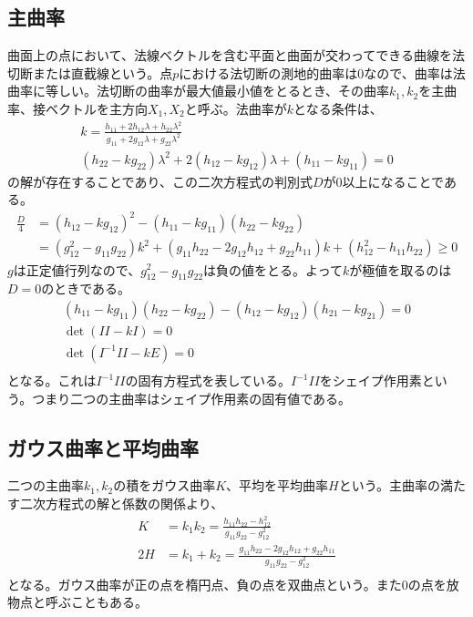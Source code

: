     \subsection{主曲率}
        曲面上の点において、法線ベクトルを含む平面と曲面が交わってできる曲線を法切断または直截線という。点$p$における法切断の測地的曲率は0なので、曲率は法曲率に等しい。法切断の曲率が最大値最小値をとるとき、その曲率$k_1,k_2$を主曲率、接ベクトルを主方向$X_1,X_2$と呼ぶ。法曲率が$k$となる条件は、
        \begin{gather*}
            k = \frac{h_{11} + 2h_{12}\lambda + h_{22}\lambda^2}{g_{11} + 2g_{12}\lambda + g_{22}\lambda^2}\\
            (h_{22}-kg_{22})\lambda^2 + 2(h_{12}-kg_{12})\lambda + (h_{11}-kg_{11}) = 0
        \end{gather*}
        の解が存在することであり、この二次方程式の判別式$D$が0以上になることである。
        \begin{align*}
            \frac{D}{4} &= (h_{12}-kg_{12})^2 - (h_{11}-kg_{11})(h_{22}-kg_{22})\\
            &= (g_{12}^2-g_{11}g_{22})k^2
            + (g_{11}h_{22}-2g_{12}h_{12}+g_{22}h_{11})k
            + (h_{12}^2-h_{11}h_{22}) \geq 0
        \end{align*}
        $g$は正定値行列なので、$g_{12}^2-g_{11}g_{22}$は負の値をとる。よって$k$が極値を取るのは$D = 0$のときである。
        \begin{align*}
            (h_{11}-kg_{11})(h_{22}-kg_{22})
            -(h_{12}-kg_{12})(h_{21}-kg_{21}) = 0\\
            \det(II - kI) = 0\\
            \det(I^{-1}II - kE) = 0\\
        \end{align*}
        となる。これは$I^{-1}II$の固有方程式を表している。$I^{-1}II$をシェイプ作用素という。つまり二つの主曲率はシェイプ作用素の固有値である。

    \subsection{ガウス曲率と平均曲率}
        二つの主曲率$k_1,k_2$の積をガウス曲率$K$、平均を平均曲率$H$という。主曲率の満たす二次方程式の解と係数の関係より、
        \begin{align*}
            K &= k_1k_2 = \frac{h_{11}h_{22} - h_{12}^2}{g_{11}g_{22} - g_{12}^2}\\
            2H &= k_1+k_2 = \frac{g_{11}h_{22} - 2g_{12}h_{12} + g_{22}h_{11}}
            {g_{11}g_{22}-g_{12}^2}\\
        \end{align*}
        となる。ガウス曲率が正の点を楕円点、負の点を双曲点という。また0の点を放物点と呼ぶこともある。

